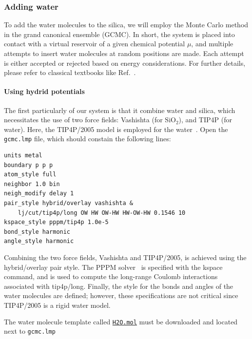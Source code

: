 \documentclass[9pt,tutorial]{livecoms}
\newcommand{\lmpcmd}[1]{\hspace{0pt}\colorbox{listing}{\textcolor{command}{\small{#1}}}\hspace{0pt}} %
\newcommand{\flecmd}[1]{\textcolor{command}{\texttt{#1}}} %
\newcommand{\dwlcmd}[1]{\textcolor{download}{\texttt{#1}}} %
\newcommand{\filepath}{https://raw.githubusercontent.com/lammpstutorials/lammpstutorials-article/main/files/}
\begin{document}
\subsubsection{Adding water}

\noindent To add the water molecules to the silica, we will employ
the Monte Carlo method in the grand canonical ensemble (GCMC).  In short, the
system is placed into contact with a virtual reservoir of a given chemical potential
$\mu$, and multiple attempts to insert water molecules at random positions are
made. Each attempt is either accepted or rejected based on energy considerations.
For further details, please refer to classical textbooks like Ref.~.

\paragraph{Using hydrid potentials}

\noindent The first particularly of our system is that it
combine water and silica, which necessitates the use
of two force fields: Vashishta (for $\text{SiO}_2$), and
TIP4P (for water).  Here, the TIP4P/2005 model is employed for the
water~\cite{abascal2005general}.  Open the \flecmd{gcmc.lmp} file, which
should constain the following lines:
\begin{lstlisting}
units metal
boundary p p p
atom_style full
neighbor 1.0 bin
neigh_modify delay 1
pair_style hybrid/overlay vashishta &
    lj/cut/tip4p/long OW HW OW-HW HW-OW-HW 0.1546 10
kspace_style pppm/tip4p 1.0e-5
bond_style harmonic
angle_style harmonic
\end{lstlisting}
Combining the two force fields, Vashishta and TIP4P/2005, is achieved
using the \lmpcmd{hybrid/overlay} pair style.  The PPPM
solver~\cite{luty1996calculating} is specified with the \lmpcmd{kspace}
command, and is used to compute the long-range Coulomb interactions associated
with \lmpcmd{tip4p/long}.  Finally, the style for the bonds
and angles of the water molecules are defined; however, these specifications are
not critical since TIP4P/2005 is a rigid water model.

The water molecule template called \href{\filepath tutorial6/H2O.mol}{\dwlcmd{H2O.mol}}
must be downloaded and located next to \flecmd{gcmc.lmp}
\end{document}
